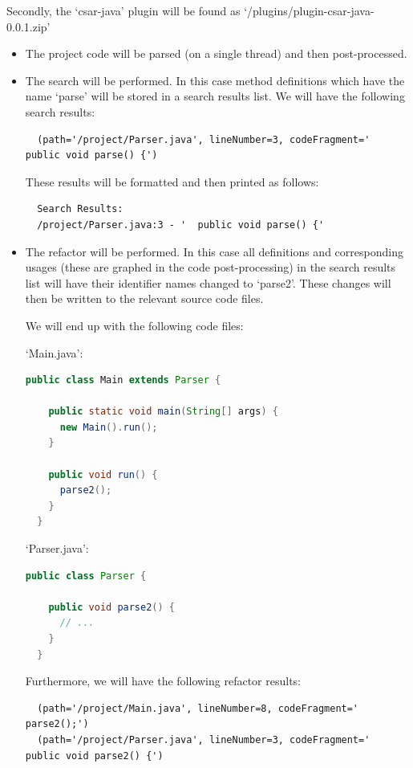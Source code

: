\documentclass[12pt, letterpaper]{article}
\begin{document}
Secondly, the `csar-java' plugin will be found as `/plugins/plugin-csar-java-0.0.1.zip'
\begin{itemize}
  \item The project code will be parsed (on a single thread) and then post-processed.
  \item The search will be performed.
  In this case method definitions which have the name `parse' will be stored in a search results list.
  We will have the following search results:
  \begin{lstlisting}
  (path='/project/Parser.java', lineNumber=3, codeFragment='  public void parse() {')
  \end{lstlisting}

  These results will be formatted and then printed as follows:
  \begin{lstlisting}
  Search Results:
  /project/Parser.java:3 - '  public void parse() {'
  \end{lstlisting}
  \item The refactor will be performed.
  In this case all definitions and corresponding usages (these are graphed in the code post-processing) in the search results list will have their identifier names changed to `parse2'.
  These changes will then be written to the relevant source code files.
  
  We will end up with the following code files:

  `Main.java':
  \begin{lstlisting}[language=Java]
  public class Main extends Parser {
  
    public static void main(String[] args) {
      new Main().run();
    }
  
    public void run() {
      parse2();
    }
  }
  \end{lstlisting}
  
  `Parser.java':
  \begin{lstlisting}[language=Java]
  public class Parser {
  
    public void parse2() {
      // ...
    }
  }
  \end{lstlisting}
  
  Furthermore, we will have the following refactor results:
  \begin{lstlisting}
  (path='/project/Main.java', lineNumber=8, codeFragment='    parse2();')
  (path='/project/Parser.java', lineNumber=3, codeFragment='  public void parse2() {')
  \end{lstlisting}
\end{itemize}
\end{document}
